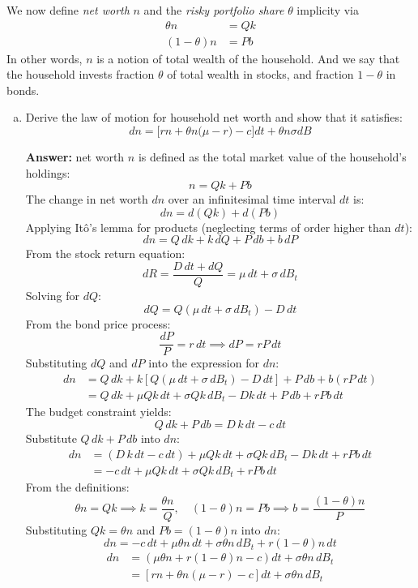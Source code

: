 \documentclass[11pt]{extarticle}
\theoremstyle{plain}
\theoremstyle{definition}
\begin{document}
We now define \textit{net worth} $n$ and the \textit{risky portfolio share} $\theta$ implicity via 
\begin{align*}
	\theta n &= Q k \\
	(1-\theta) n &= Pb
\end{align*}
In other words, $n$ is a notion of total wealth of the household. And we say that the household invests fraction $\theta$ of total wealth in stocks, and fraction $1-\theta$ in bonds.  


\vspace{5mm}
\begin{enumerate}[(a)]
\item Derive the law of motion for household net worth and show that it satisfies:
\begin{equation*}
	dn = \bigg[ r n + \theta n \Big( \mu - r \Big) - c \bigg] dt + \theta n \sigma dB
\end{equation*}

\textbf{Answer:} net worth \( n \) is defined as the total market value of the household's holdings:
\[
n = Q k + P b
\]
The change in net worth \( dn \) over an infinitesimal time interval \( dt \) is:
\[
dn = d(Q k) + d(P b)
\]
Applying Itô's lemma for products (neglecting terms of order higher than \( dt \)):
\[
dn = Q \, dk + k \, dQ + P \, db + b \, dP
\]
From the stock return equation:
\[
dR = \frac{D \, dt + dQ}{Q} = \mu \, dt + \sigma \, dB_t
\]
Solving for \( dQ \):
\[
dQ = Q \left( \mu \, dt + \sigma \, dB_t \right) - D \, dt
\]
From the bond price process:
\[
\frac{dP}{P} = r \, dt \implies dP = r P \, dt
\]
Substituting \( dQ \) and \( dP \) into the expression for \( dn \):
\[
\begin{aligned}
dn &= Q \, dk + k \left[ Q \left( \mu \, dt + \sigma \, dB_t \right) - D \, dt \right] + P \, db + b \left( r P \, dt \right) \\
&= Q \, dk + \mu Q k \, dt + \sigma Q k \, dB_t - D k \, dt + P \, db + r P b \, dt
\end{aligned}
\]
The budget constraint yields:
\[
Q \, dk + P \, db = D \, k \, dt - c \, dt
\]
Substitute \( Q \, dk + P \, db \) into \( dn \):
\[
\begin{aligned}
dn &= \left( D \, k \, dt - c \, dt \right) + \mu Q k \, dt + \sigma Q k \, dB_t - D k \, dt + r P b \, dt \\
&= - c \, dt + \mu Q k \, dt + \sigma Q k \, dB_t + r P b \, dt
\end{aligned}
\]
From the definitions:
\[
\theta n = Q k \implies k = \frac{\theta n}{Q}, \quad (1 - \theta) n = P b \implies b = \frac{(1 - \theta) n}{P}
\]
Substituting \( Q k = \theta n \) and \( P b = (1 - \theta) n \) into \( dn \):
\[
dn = - c \, dt + \mu \theta n \, dt + \sigma \theta n \, dB_t + r (1 - \theta) n \, dt
\]
\[
\begin{aligned}
dn &= \left( \mu \theta n + r (1 - \theta) n - c \right) dt + \sigma \theta n \, dB_t \\
&= \left[ r n + \theta n (\mu - r) - c \right] dt + \sigma \theta n \, dB_t
\end{aligned}
\]



\end{enumerate}
\end{document}
